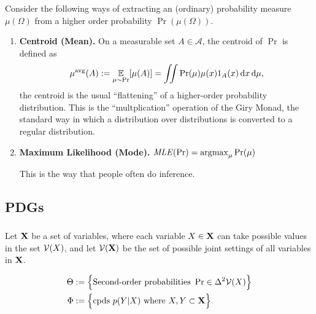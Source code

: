 \documentclass{article}
\begin{document}
\[
\]



Consider the following ways of extracting an (ordinary) probability measure $\mu(\Omega)$
from a higher order probability $\Pr(\mu(\Omega))$.

\begin{enumerate}
    \item \textbf{Centroid (Mean).}
        On a measurable set $A \in \mathcal A$, the centroid of $\Pr$ is defined as
        \[
            \mu^{\text{avg}}(A) := \operatorname*{\mathbb{E}}_{\mu \sim \Pr}[ \mu(A)] =
                \iint \Pr(\mu) \mu(x) 1_{A}(x)\, \mathrm d x\,\mathrm d\mu,
        \]
        the centroid is the usual ``flattening'' of a higher-order probability distribution.
        This is the ``multplication'' operation of the Giry Monad, the standard way in which a distribution over distributions is converted to a regular distribution.

    \item \textbf{Maximum Likelihood (Mode).}
        $\mathit{MLE}(\Pr) = \operatorname*{\arg\!\max}_\mu \Pr(\mu)$

        This is the way that people often do inference.


\end{enumerate}


\subsection{PDGs}


\subsubsection{}
Let $\mathbf{X}$ be a set of variables, where each variable $X \in \mathbf{X}$ can take possible values in the set $\mathcal V(X)$, and let $\mathcal V(\mathbf{X})$ be the set of possible joint settings of all variables in $\mathbf{X}$.

\begin{align*}
    \Theta &:=
        \Big\{
        \text{Second-order probabilities}~ \Pr \in \Delta^2 \mathcal V(X)
        \Big\} \\
    \Phi &:= \Big\{ \text{cpds}~ p(Y|X)
        \text{ where }  X, Y \subset \mathbf{X} \Big\}
\end{align*}
\end{document}
